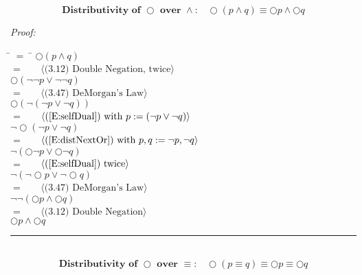 \documentclass[fleqn, leqno]{article}
\newcommand{\lgap}{2pt}                             %
\newcommand{\mymathindent}{24pt}                      %
\newcommand{\myqed}{\hfill\rule[-.23ex]{1.2ex}{2.0ex}}
\newcommand{\Gll} {\langle}                         %
\newcommand{\Ggg} {\rangle}                         %
\newcommand{\Hint}[1]     {\ \ \ $\Gll              \mbox{#1} \Ggg$ }   %
\begin{document}
\begin{equation}\label{E:distNextAnd}
\textbf{Distributivity of $\bigcirc$ over $\land$:}\quad \bigcirc (p \land q) \equiv \bigcirc p \land \bigcirc q
\end{equation}


\emph{Proof:}
\begin{tabbing}
\hspace{\mymathindent} \= $= \;$ \= \kill
  \> \>   $\bigcirc (p \land q)$\\[\lgap]
  \> $=$  \>  \Hint{(3.12) Double Negation, twice}\\[\lgap]
  \> \>   $\bigcirc (\lnot\lnot p \lor \lnot\lnot q)$\\[\lgap]
  \> $=$  \>  \Hint{(3.47) DeMorgan's Law}\\[\lgap]
  \> \>   $\bigcirc (\lnot(\lnot p \lor \lnot q))$\\[\lgap]
  \> $=$  \>  \Hint{(\ref{E:selfDual}) with $p:= (\lnot p \lor \lnot q$)}\\[\lgap]
  \> \>   $\lnot\bigcirc (\lnot p \lor \lnot q)$\\[\lgap]
  \> $=$  \>  \Hint{(\ref{E:distNextOr}) with $p,q := \lnot p, \lnot q$}\\[\lgap]
  \> \>   $\lnot (\bigcirc\lnot p \lor \bigcirc \lnot q)$\\[\lgap]
  \> $=$  \>  \Hint{(\ref{E:selfDual}) twice}\\[\lgap]
  \> \>   $\lnot(\lnot\bigcirc p \lor \lnot\bigcirc q)$\\[\lgap]
  \> $=$  \>  \Hint{(3.47) DeMorgan's Law}\\[\lgap]
  \> \>   $\lnot\lnot(\bigcirc p \land \bigcirc q)$\\[\lgap]
  \> $=$  \>  \Hint{(3.12) Double Negation}\\[\lgap]
  \> \>   $\bigcirc p \land \bigcirc q$\\[\lgap]
\end{tabbing}
\myqed\\[\lgap]


\begin{equation}\label{E:distNextEquiv}
\textbf{Distributivity of $\bigcirc$ over $\equiv$:}\quad \bigcirc (p \equiv q) \equiv \bigcirc p \equiv \bigcirc q
\end{equation}
\end{document}
